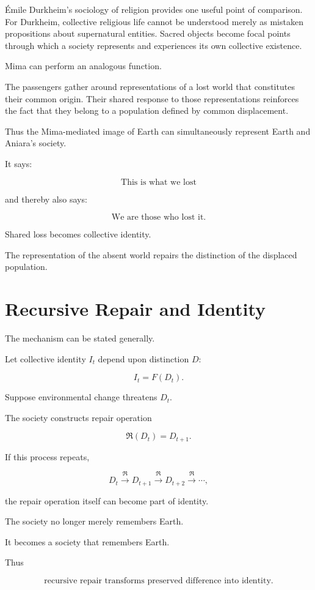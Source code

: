 \documentclass[11pt,oneside]{book}
\theoremstyle{definition}
\theoremstyle{remark}
\newcommand{\Repair}{\mathfrak{R}}
\begin{document}
Émile Durkheim's sociology of religion provides one useful point of comparison. For Durkheim, collective religious life cannot be understood merely as mistaken propositions about supernatural entities. Sacred objects become focal points through which a society represents and experiences its own collective existence.

Mima can perform an analogous function.

The passengers gather around representations of a lost world that constitutes their common origin. Their shared response to those representations reinforces the fact that they belong to a population defined by common displacement.

Thus the Mima-mediated image of Earth can simultaneously represent Earth and Aniara's society.

It says:

\[
\text{This is what we lost}
\]

and thereby also says:

\[
\text{We are those who lost it}.
\]

Shared loss becomes collective identity.

The representation of the absent world repairs the distinction of the displaced population.

\section{Recursive Repair and Identity}

The mechanism can be stated generally.

Let collective identity \(I_t\) depend upon distinction \(D\):

\[
I_t=F(D_t).
\]

Suppose environmental change threatens \(D_t\).

The society constructs repair operation

\[
\Repair(D_t)
=
D_{t+1}.
\]

If this process repeats,

\[
D_t
\xrightarrow{\Repair}
D_{t+1}
\xrightarrow{\Repair}
D_{t+2}
\xrightarrow{\Repair}
\cdots,
\]

the repair operation itself can become part of identity.

The society no longer merely remembers Earth.

It becomes a society that remembers Earth.

Thus

\[
\boxed{
\text{recursive repair transforms preserved difference into identity}.
}
\]
\end{document}
